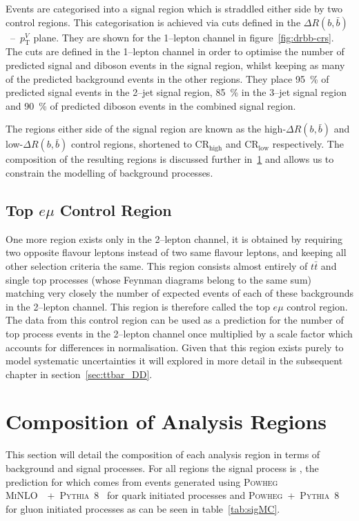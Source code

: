 Events are categorised into a signal region which is straddled either side by
two control regions. This categorisation is achieved via cuts defined in the
$\Delta R(b, \bar{b})$~--~$p_{\mathrm{T}}^{V}$ plane. They are shown for the
1--lepton channel in figure~\ref{fig:drbb-crs}. The cuts are defined in the
1--lepton channel in order to optimise the number of predicted signal and
diboson events in the signal region, whilst keeping as many of the predicted
background events in the other regions. They place 95~\% of predicted signal
events in the 2--jet signal region, 85~\% in the 3--jet signal region and 90~\%
of predicted diboson events in the combined signal region.

The regions either side of the signal region are known as the high-$\Delta R(b,
\bar{b})$ and low-$\Delta R(b, \bar{b})$ control regions, shortened to
CR$_{\text{high}}$ and CR$_{\text{low}}$ respectively. The composition of the
resulting regions is discussed further in~\ref{sec:composition} and allows us to
constrain the modelling of background processes.

\subsection{Top \texorpdfstring{$e \mu$}{e mu} Control Region}%
\label{sec:topemucr}

One more region exists only in the 2--lepton channel, it is obtained by
requiring two opposite flavour leptons instead of two same flavour leptons, and
keeping all other selection criteria the same. This region consists almost
entirely of $t\bar{t}$ and single top processes (whose Feynman diagrams belong
to the same sum) matching very closely the number of expected events of each of
these backgrounds in the 2--lepton channel. This region is therefore called the
top $e \mu$ control region. The data from this control region can be used as a
prediction for the number of top process events in the 2--lepton channel once
multiplied by a scale factor which accounts for differences in normalisation.
Given that this region exists purely to model systematic uncertainties it will
explored in more detail in the subsequent chapter in section~\ref{sec:ttbar_DD}.

\section{Composition of Analysis Regions}
\label{sec:composition}

This section will detail the composition of each analysis region in terms of
background and signal processes. For all regions the signal process is \VHbb,
the prediction for which comes from events generated using \textsc{Powheg
MiNLO}~\cite{Luisoni2013}~+~\textsc{Pythia~8}~\cite{pythia8} for quark initiated
processes and \textsc{Powheg}~+~\textsc{Pythia~8} for gluon initiated processes
as can be seen in table~\ref{tab:sigMC}. 

